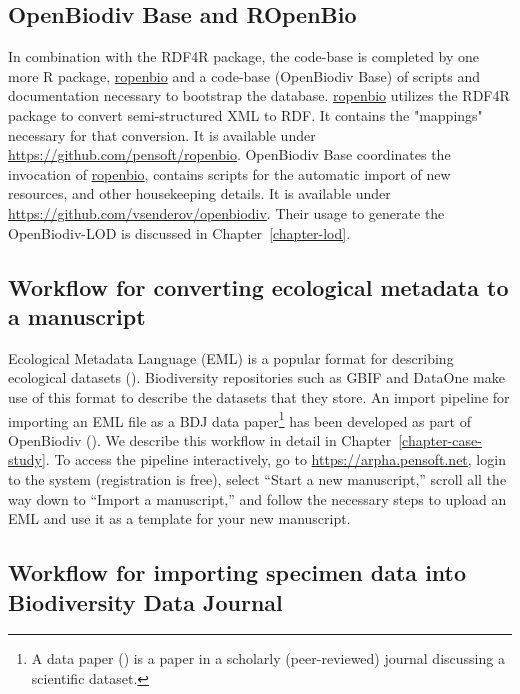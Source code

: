 \subsection{OpenBiodiv Base and ROpenBio}

In combination with the RDF4R package, the code-base is completed by one more R package, \url{ropenbio} and a code-base (OpenBiodiv Base) of scripts and documentation necessary to bootstrap the database. \url{ropenbio} utilizes the RDF4R package to convert semi-structured XML to RDF. It contains the "mappings" necessary for that conversion. It is available under \url{https://github.com/pensoft/ropenbio}. OpenBiodiv Base coordinates the invocation of \url{ropenbio}, contains scripts for the automatic import of new resources, and other housekeeping details. It is available under \url{https://github.com/vsenderov/openbiodiv}. Their usage to generate the OpenBiodiv-LOD is discussed in Chapter~\ref{chapter-lod}.

\subsection{Workflow for converting ecological metadata to a manuscript}  

Ecological Metadata Language (EML) is a popular format for describing ecological datasets (\cite{michener_nongeospatial_1997}). Biodiversity repositories such as GBIF and DataOne make use of this format to describe the datasets that they store. An import pipeline for importing an EML file as a BDJ data paper\footnote{A data paper (\cite{chavan_data_2011}) is a paper in a scholarly (peer-reviewed) journal discussing a scientific dataset.} has been developed as part of OpenBiodiv (\cite{senderov_online_2016}). We describe this workflow in detail in Chapter~\ref{chapter-case-study}. To access the pipeline interactively, go to \url{https://arpha.pensoft.net}, login to the system (registration is free), select ``Start a new manuscript,'' scroll all the way down to ``Import a manuscript,'' and follow the necessary steps to upload an EML and use it as a template for your new manuscript.

\subsection{Workflow for importing specimen data into Biodiversity Data Journal}

